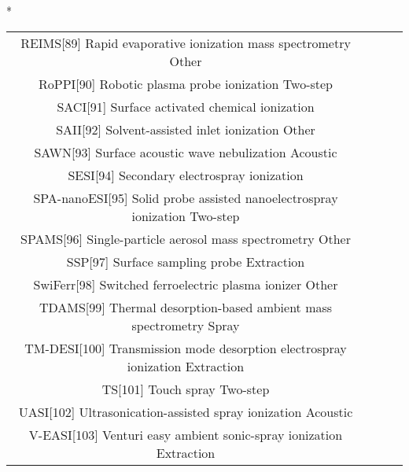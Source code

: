 \begin{table}{*}
\begin{tabular}{|c|c|c|l|}
REIMS[89] Rapid evaporative ionization mass spectrometry Other \\
RoPPI[90] Robotic plasma probe ionization Two-step \\
SACI[91] Surface activated chemical ionization  \\
SAII[92] Solvent-assisted inlet ionization Other \\
SAWN[93] Surface acoustic wave nebulization Acoustic \\
SESI[94] Secondary electrospray ionization  \\
SPA-nanoESI[95] Solid probe assisted nanoelectrospray ionization Two-step \\
SPAMS[96] Single-particle aerosol mass spectrometry Other \\
SSP[97] Surface sampling probe Extraction \\
SwiFerr[98] Switched ferroelectric plasma ionizer Other \\
    TDAMS[99] Thermal desorption-based ambient mass spectrometry Spray \\
    TM-DESI[100] Transmission mode desorption electrospray ionization Extraction \\
    TS[101] Touch spray Two-step \\
    UASI[102] Ultrasonication-assisted spray ionization Acoustic \\
    V-EASI[103] Venturi easy ambient sonic-spray ionization Extraction \\
    \hline \hline 
    \end{tabular} 
\end{table}